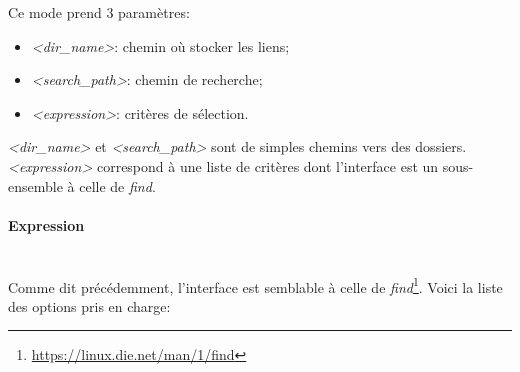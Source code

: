 \documentclass[11pt, a4paper]{article}
\newcommand{\paragraphnl}[1]{\paragraph{#1}\mbox{}\\}
\begin{document}
Ce mode prend 3 paramètres:
\begin{itemize}
    \item \textit{<dir\_name>}: chemin où stocker les liens;
    \item \textit{<search\_path>}: chemin de recherche;
    \item \textit{<expression>}: critères de sélection. \\
\end{itemize}

\textit{<dir\_name>} et \textit{<search\_path>} sont de simples chemins vers des dossiers.\\
\textit{<expression>} correspond à une liste de critères dont l'interface est un sous-ensemble à celle de \textit{find}.

\paragraphnl{Expression}
Comme dit précédemment, l'interface est semblable à celle de \textit{find}\footnote{\url{https://linux.die.net/man/1/find}}.
Voici la liste des options pris en charge:\\
\end{document}
